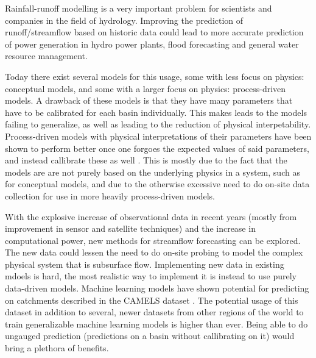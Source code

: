 Rainfall-runoff modelling is a very important problem for scientists and 
companies in the field of hydrology. Improving the prediction of runoff/streamflow 
based on historic data could lead to more accurate prediction of power generation 
in hydro power plants, flood forecasting and general water resource management.

Today there exist several models for this usage, some with less focus on physics: 
conceptual models, and some with a larger focus on physics: process-driven models. \citationneeded
A drawback of these models is that they have many parameters that have to be 
calibrated for each basin individually. 
This makes leads to the models failing to generalize, as well as leading to the 
reduction of physical interpetability. Process-driven models with physical interpretations 
of their parameters have been shown to perform better once one forgoes the expected 
values of said parameters, and instead callibrate these as well \citep[e.g.][]{VICbench, BiasVarianceVIC}.
This is mostly due to the fact that the models are are not purely based on the 
underlying physics in a system, such as for conceptual models, and due to 
the otherwise excessive need to do on-site data collection for use in more heavily 
process-driven models. 

With the explosive increase of observational data in recent years (mostly from 
improvement in sensor and satellite techniques) and the increase in computational 
power, new methods for streamflow forecasting can be explored. The new data could 
lessen the need to do on-site probing to model the complex physical system that is 
subsurface flow. Implementing new data in existing mdoels is hard, the most realistic 
way to implement it is instead to use purely data-driven models. Machine learning 
models have shown potential for predicting on catchments described in the CAMELS 
dataset \citep{CAMELS_US}. The potential usage of this dataset in addition to several, 
newer datasets from other regions of the world to train generalizable 
machine learning models is higher than ever. Being able to do ungauged prediction 
(predictions on a basin without callibrating on it) would bring a plethora of benefits.

